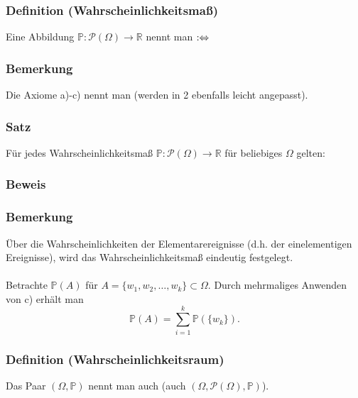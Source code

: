 \subsubsection{Definition (Wahrscheinlichkeitsma\ss{})}
Eine Abbildung $\mathbb{P}\colon\mathcal{P}(\Omega)\to\mathbb{R}$ nennt man  $:\Leftrightarrow$
\subsubsection{Bemerkung}
Die Axiome a)-c) nennt man  (werden in 2 ebenfalls leicht angepasst).
\subsubsection{Satz}
F\"ur jedes Wahrscheinlichkeitsma\ss{} $\mathbb{P}\colon\mathcal{P}(\Omega)\to\mathbb{R}$ f\"ur beliebiges $\Omega$ gelten:
\subsubsection{Beweis}
\weg
\subsubsection{Bemerkung}
\"Uber die Wahrscheinlichkeiten der Elementarereignisse (d.h. der einelementigen Ereignisse), wird das Wahrscheinlichkeitsma\ss{} eindeutig festgelegt.
\\~\\
Betrachte $\mathbb{P}(A)$ f\"ur $A=\{w_1,w_2,\ldots,w_k\}\subset\Omega$. Durch mehrmaliges Anwenden von c) erh\"alt man
\[
\mathbb{P}(A)=\sum_{i=1}^{k}\mathbb{P}(\{w_k\}).
\]
\subsubsection{Definition (Wahrscheinlichkeitsraum)}
Das Paar $(\Omega,\mathbb{P})$ nennt man auch  (auch $(\Omega,\mathcal{P}(\Omega),\mathbb{P})$).

